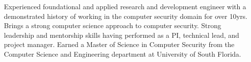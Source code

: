 

\begin{cvparagraph}

Experienced foundational and applied research and development engineer with a demonstrated history of working in the computer security domain for over 10yrs. Brings a strong computer science approach to computer security. Strong leadership and mentorship skills having performed as a PI, technical lead, and project manager. Earned a Master of Science in Computer Security from the Computer Science and Engineering department at University of South Florida.

\end{cvparagraph}
